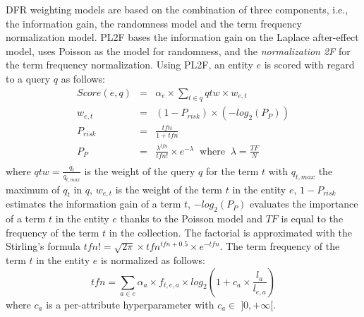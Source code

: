 DFR weighting models are based on the combination of three components, i.e., the information gain, the randomness model and the term frequency normalization model. PL2F bases the information gain on the Laplace after-effect model, uses Poisson as the model for randomness, and the \emph{normalization 2F} for the term frequency normalization.
Using PL2F, an entity $e$ is scored with regard to a query $q$ as follows:
\begin{eqnarray*}
  Score(e,q) & = & \alpha_e\times\sum_{t\in q}{qtw \times w_{e,t}}\\
  \label{eq:dfr-score}
  w_{e,t} & = & \left(1-P_{risk}\right) \times \left(-log_2\left(P_{P}\right)\right) \\
  \label{eq:dfr-term-weight}
  P_{risk} & = & \frac{tfn}{1+tfn} \\
  \label{eq:dfr-prisk}
  P_{P} & = & \frac{\lambda^{tfn}}{tfn!}\times e^{-\lambda} \:\text{ where }\: \lambda=\frac{TF}{N} \\
  \label{eq:dfr:rand-poisson}
\end{eqnarray*}
where $qtw=\frac{q_t}{q_{t,max}}$ is the weight of the query $q$ for the term $t$ with $q_{t,max}$ the maximum of $q_t$ in $q$, $w_{e,t}$ is the weight of the term $t$ in the entity $e$, $1-P_{risk}$ estimates the information gain of a term $t$, $-log_2\left(P_{P}\right)$ evaluates the importance of a term $t$ in the entity $e$ thanks to the Poisson model and $TF$ is equal to the frequency of the term $t$ in the collection. The factorial is approximated with the Stirling's formula \mbox{$tfn!=\sqrt{2\pi}\times tfn^{tfn+0.5}\times e^{-tfn}$}.
The term frequency of the term $t$ in the entity $e$ is normalized as follows:
\begin{equation}
  tfn = \sum_{a\in e}{\alpha_a\times f_{t,e,a} \times log_2\left(1+c_a\times\frac{l_a}{l_{e,a}}\right)}
  \label{eq:pl2f}
\end{equation}
where $c_a$ is a per-attribute hyperparameter with $c_a \in\;]0,+\infty[$.
